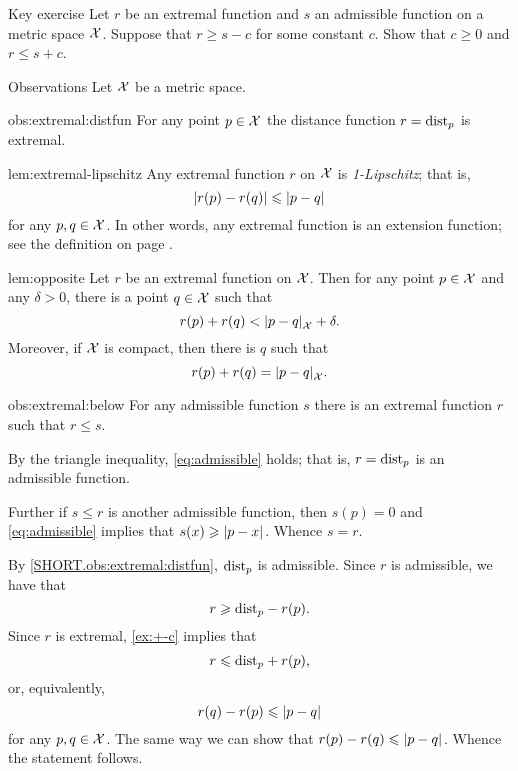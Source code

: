 \begin{thm}{Key exercise}\label{ex:+-c}
Let $r$ be an extremal function and $s$ an admissible function on a metric space $\mathcal{X}$.
Suppose that $r\ge s-c$ for some constant $c$.
Show that $c\ge 0$ and $r\le s+c$.
\end{thm}


\begin{thm}{Observations}\label{obs:extremal}
Let $\mathcal{X}$ be a metric space.

\begin{subthm}{obs:extremal:distfun}
For any point $p\in\mathcal{X}$
the distance function $r\z=\distfun_p$ is extremal.
\end{subthm}

\begin{subthm}{lem:extremal-lipschitz}
Any extremal function $r$ on $\mathcal{X}$ is \emph{1-Lipschitz};
that is,
\[|r(p)-r(q)|\le \dist{p}{q}{}\]
for any $p,q\in\mathcal{X}$.
In other words, any extremal function is an extension function; see the definition on page \pageref{page:extension function}.
\end{subthm}

\begin{subthm}{lem:opposite}
Let $r$ be an extremal function on $\mathcal{X}$.
Then for any point $p\in\mathcal{X}$ and any $\delta>0$, there is a point $q\in \mathcal{X}$
such that 
\[r(p)+r(q)<\dist{p}{q}{\spc{X}}+\delta.\]
Moreover, if $\mathcal{X}$ is compact, then there is $q$ such that 
\[r(p)+r(q)=\dist{p}{q}{\spc{X}}.\]
\end{subthm}


\begin{subthm}{obs:extremal:below}
For any admissible function $s$ there is an extremal function $r$ such that $r\le s$.
\end{subthm}

\end{thm}

By the triangle inequality, \ref{eq:admissible} holds;
that is, $r=\mathrm{dist}_p$ is an admissible function.

Further if $s\le r$ is another admissible function, then $s(p)=0$ and \ref{eq:admissible} implies that $s(x)\z\ge\dist{p}{x}{}$.
Whence $s=r$.

By \ref{SHORT.obs:extremal:distfun}, $\mathrm{dist}_p$ is admissible.
Since $r$ is admissible, we have that
\[r\geqslant \mathrm{dist}_p-r(p).\]
Since $r$ is extremal, \ref{ex:+-c} implies that
\[r\leqslant \mathrm{dist}_p+r(p),\]
or, equivalently,
\[r(q)-r(p)\le \dist{p}{q}{}\]
for any $p,q\in\mathcal{X}$.
The same way we can show that
$r(p)-r(q)\le \dist{p}{q}{}$.
Whence the statement follows.

